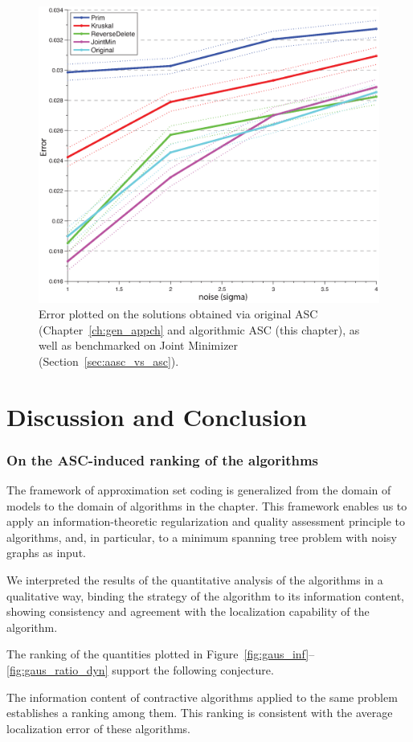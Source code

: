 \begin{figure}[!t]
\centering
\includegraphics[width=.9\textwidth]{figures/ch_mst/gen_6_all}
\caption{Error plotted on the solutions obtained via original ASC
  (Chapter~\ref{ch:gen_appch} and algorithmic ASC (this chapter), as well as benchmarked on
  Joint Minimizer (Section~\ref{sec:aasc_vs_asc}).}
\label{fig:aasc_vs_original}
\end{figure}

\section{Discussion and Conclusion}
\label{sec:mst_conclusion}

\subsubsection{On the ASC-induced ranking of the algorithms}
The framework of approximation set coding is generalized from
the domain of models to the domain of algorithms in the
chapter. This framework enables us to apply an information-theoretic
regularization and quality assessment principle to algorithms,
and, in particular, to a minimum spanning tree problem with noisy
graphs as input.

We interpreted the results of the quantitative analysis of the
algorithms in a qualitative way, binding the strategy of the algorithm
to its information content, showing consistency and agreement with the
localization capability of the algorithm.

The ranking of the quantities plotted in
Figure~\ref{fig:gaus_inf}--\ref{fig:gaus_ratio_dyn}
support the following conjecture.
\begin{conj}
  The information content of contractive algorithms applied to the
  same problem establishes a ranking among them. This ranking is
  consistent with the average localization error of these algorithms.
\end{conj}


